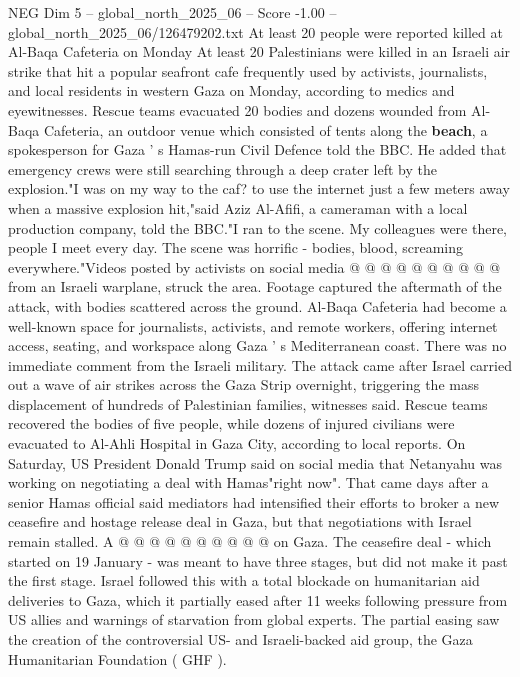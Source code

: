 \begin{textsample}{NEG Dim 5 – global\_north\_2025\_06 – Score -1.00 – global\_north\_2025\_06/126479202.txt}  \label{ex:f5_neg_370}
At least 20 people were reported killed at Al-Baqa Cafeteria on Monday At least 20 Palestinians were killed in an Israeli air strike that hit a popular seafront cafe frequently used by activists, journalists, and local residents in western Gaza on Monday, according to medics and eyewitnesses.
Rescue teams evacuated 20 bodies and dozens wounded from Al-Baqa Cafeteria, an outdoor venue which consisted of tents along the \textbf{beach}, a spokesperson for Gaza ' s Hamas-run Civil Defence told the BBC.
He added that emergency crews were still searching through a deep crater left by the explosion."I was on my way to the caf? to use the internet just a few meters away when a massive explosion hit,"said Aziz Al-Afifi, a cameraman with a local production company, told the BBC."I ran to the scene.
My colleagues were there, people I meet every day.
The scene was horrific - bodies, blood, screaming everywhere."Videos posted by activists on social media @ @ @ @ @ @ @ @ @ @ from an Israeli warplane, struck the area.
Footage captured the aftermath of the attack, with bodies scattered across the ground.
Al-Baqa Cafeteria had become a well-known space for journalists, activists, and remote workers, offering internet access, seating, and workspace along Gaza ' s Mediterranean coast.
There was no immediate comment from the Israeli military.
The attack came after Israel carried out a wave of air strikes across the Gaza Strip overnight, triggering the mass displacement of hundreds of Palestinian families, witnesses said.
Rescue teams recovered the bodies of five people, while dozens of injured civilians were evacuated to Al-Ahli Hospital in Gaza City, according to local reports.
On Saturday, US President Donald Trump said on social media that Netanyahu was working on negotiating a deal with Hamas"right now".
That came days after a senior Hamas official said mediators had intensified their efforts to broker a new ceasefire and hostage release deal in Gaza, but that negotiations with Israel remain stalled.
A @ @ @ @ @ @ @ @ @ @ on Gaza.
The ceasefire deal - which started on 19 January - was meant to have three stages, but did not make it past the first stage.
Israel followed this with a total blockade on humanitarian aid deliveries to Gaza, which it partially eased after 11 weeks following pressure from US allies and warnings of starvation from global experts.
The partial easing saw the creation of the controversial US- and Israeli-backed aid group, the Gaza Humanitarian Foundation ( GHF ).

\end{textsample}
